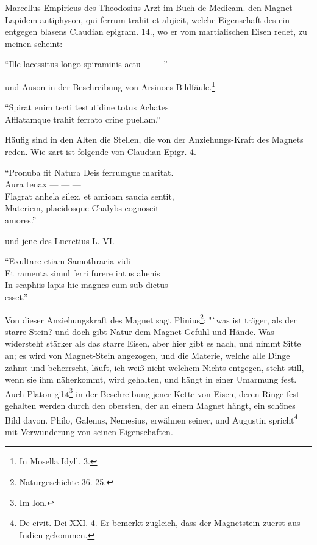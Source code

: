 \documentclass[a4paper, 11pt, oneside, polutonikogreek, german]{article}
\begin{document}
Marcellus Empiricus des Theodosius Arzt im Buch de Medicam. den Magnet Lapidem antiphyson, qui ferrum trahit et abjicit, welche Eigenschaft des ein-entgegen blasens Claudian epigram. 14., wo er vom martialischen Eisen redet, zu meinen scheint:

"`Ille lacessitus longo spiraminis actu --- ---"'

und Auson in der Beschreibung von Arsinoes Bildfäule.\footnote{In Mosella Idyll. 3.}

"`Spirat enim tecti testutidine totus Achates\\
\hspace*{0.5cm} Afflatamque trahit ferrato crine puellam."'

Häufig sind in den Alten die Stellen, die von der Anziehungs-Kraft des Magnets reden. Wie zart ist folgende von Claudian Epigr. 4.

"`Pronuba fit Natura Deis ferrumgue maritat.\\
\hspace*{0.5cm} Aura tenax --- --- ---\\
\hspace*{0.5cm} Flagrat anhela silex, et amicam saucia sentit,\\
\hspace*{0.5cm} Materiem, placidosque Chalybs cognoscit\\
\hspace*{1.5cm} amores."'

und jene des Lucretius L. VI.

"`Exultare etiam Samothracia vidi\\
\hspace*{0.5cm} Et ramenta simul ferri furere intus ahenis\\
\hspace*{0.5cm} In scaphiis lapis hic magnes cum sub dictus\\
\hspace*{1.5cm} esset."'

Von dieser Anziehungskraft des Magnet sagt Plinius\footnote{Naturgeschichte 36. 25.}: "`was ist träger, als der starre Stein? und doch gibt Natur dem Magnet Gefühl und Hände. Was widersteht stärker als das starre Eisen, aber hier gibt es nach, und nimmt Sitte an; es wird von Magnet-Stein angezogen, und die Materie, welche alle Dinge zähmt und beherrscht, läuft, ich weiß nicht welchem Nichts entgegen, steht still, wenn sie ihm näherkommt, wird gehalten, und hängt in einer Umarmung fest. Auch Platon gibt\footnote{Im Ion.} in der Beschreibung jener Kette von Eisen, deren Ringe fest gehalten werden durch den obersten, der an einem Magnet hängt, ein schönes Bild davon. Philo, Galenus, Nemesius, erwähnen seiner, und Augustin spricht\footnote{De civit. Dei XXI. 4. Er bemerkt zugleich, dass der Magnetstein zuerst aus Indien gekommen.} mit Verwunderung von seinen Eigenschaften.
\end{document}
